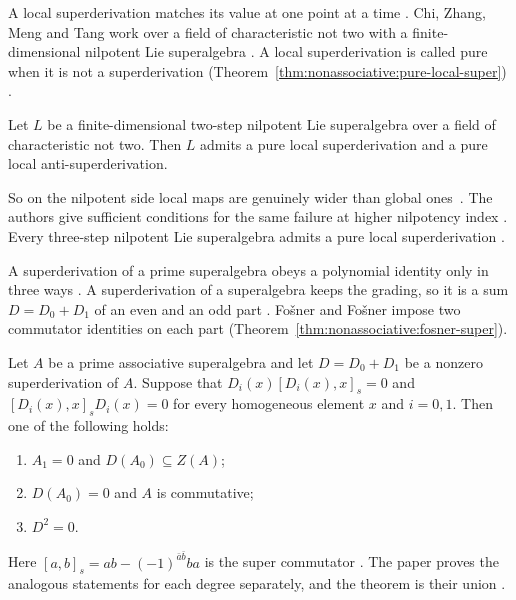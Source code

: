 A local superderivation matches its value at one point at a time
\cite[p.~1]{ChiZhangMengTang2026}. Chi, Zhang, Meng and Tang work over a field
of characteristic not two with a finite-dimensional nilpotent Lie superalgebra
\cite[p.~1]{ChiZhangMengTang2026}. A local superderivation is called pure when
it is not a superderivation
(Theorem~\ref{thm:nonassociative:pure-local-super})
\cite[p.~1]{ChiZhangMengTang2026}.

\begin{theorem}\label{thm:nonassociative:pure-local-super}
Let $L$ be a finite-dimensional two-step nilpotent Lie superalgebra over a
field of characteristic not two. Then $L$ admits a pure local
superderivation and a pure local anti-superderivation.
\end{theorem}

So on the nilpotent side local maps are genuinely wider than global ones~\cite[Theorem~4.2, p.~15]{ChiZhangMengTang2026}.
The authors give sufficient conditions for the same failure at higher
nilpotency index \cite[p.~1]{ChiZhangMengTang2026}. Every three-step
nilpotent Lie superalgebra admits a pure local superderivation
\cite[Theorem~4.2, p.~15]{ChiZhangMengTang2026}.

A superderivation of a prime superalgebra obeys a polynomial identity only in
three ways \cite[p.~304]{FosnerFosner2014}. A superderivation of a
superalgebra keeps the grading, so it is a sum $D=D_0+D_1$ of an even and an
odd part \cite[p.~304]{FosnerFosner2014}. Fošner and Fošner impose two
commutator identities on each part
(Theorem~\ref{thm:nonassociative:fosner-super}).

\begin{theorem}\label{thm:nonassociative:fosner-super}
Let $A$ be a prime associative superalgebra and let $D=D_0+D_1$ be a nonzero
superderivation of $A$. Suppose that
$D_i(x)[D_i(x),x]_s=0$ and $[D_i(x),x]_sD_i(x)=0$ for every homogeneous
element $x$ and $i=0,1$. Then one of the following holds:
\begin{enumerate}
\item $A_1=0$ and $D(A_0)\subseteq Z(A)$;
\item $D(A_0)=0$ and $A$ is commutative;
\item $D^{2}=0$.
\end{enumerate}
\end{theorem}

Here $[a,b]_s=ab-(-1)^{\bar a\bar b}ba$ is the super commutator
\cite[p.~304]{FosnerFosner2014}. The paper proves the analogous statements for
each degree separately, and the theorem is their union
\cite[Propositions~1--2, pp.~305--306]{FosnerFosner2014}.

